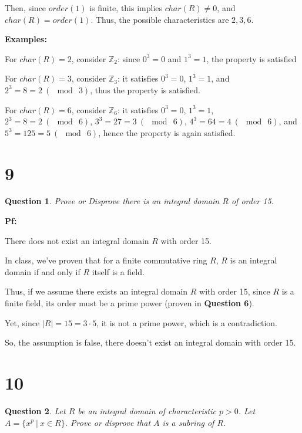 \documentclass{article}
\newtheorem{question}{Question}
\begin{document}
\hfill

Then, since $order(1)$ is finite, this implies $char(R)\neq 0$, and $char(R)=order(1)$. Thus, the possible characteristics are $2,3,6$.

\hfill

\textbf{Examples:}

For $char(R)=2$, consider $\mathbb{Z}_2$: since $0^3 = 0$ and $1^3=1$, the property is satisfied

For $char(R)=3$, consider $\mathbb{Z}_3$: it satisfies $0^3=0$, $1^3=1$, and $2^3 = 8 = 2\ (\mod\ 3)$, thus the property is satisfied.

For $char(R)=6$, consider $\mathbb{Z}_6$: it satisfies $0^3=0$, $1^3=1$, $2^3=8=2\ (\mod\ 6)$, $3^3=27=3\ (\mod\ 6)$, $4^3=64=4\ (\mod\ 6)$, and $5^3=125=5\ (\mod\ 6)$, hence the property is again satisfied.

\hfill

\hfill


\section*{9}
\begin{myBox}[]{}
    \begin{question}
        Prove or Disprove there is an integral domain $R$ of order 15.
    \end{question}
\end{myBox}

\textbf{Pf:}

There does not exist an integral domain $R$ with order 15.

In class, we've proven that for a finite commutative ring $R$, $R$ is an integral domain if and only if $R$ itself is a field.

Thus, if we assume there exists an integral domain $R$ with order 15, since $R$ is a finite field, its order must be a prime power (proven in \textbf{Question 6}).

Yet, since $|R|=15=3\cdot 5$, it is not a prime power, which is a contradiction.

So, the assumption is false, there doesn't exist an integral domain with order 15.

\hfill

\hfill


\section*{10}
\begin{myBox}[]{}
    \begin{question}
        Let $R$ be an integral domain of characteristic $p > 0$. Let $A = \{x^p\ |\ x\in R\}$. Prove or
        disprove that $A$ is a subring of $R$.
    \end{question}
\end{myBox}
\end{document}

